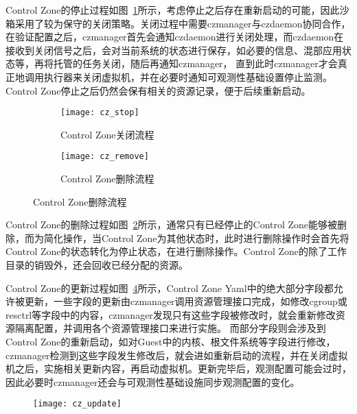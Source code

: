 Control Zone的停止过程如图~\ref{fig:cz_stop}所示，考虑停止之后存在重新启动的可能，因此沙箱采用了较为保守的关闭策略。关闭过程中需要czmanager与czdaemon协同合作，在验证配置之后，czmanager首先会通知czdaemon进行关闭处理，而czdaemon在接收到关闭信号之后，会对当前系统的状态进行保存，如必要的信息、混部应用状态等，再将托管的任务关闭，随后再通知czmanager， 直到此时czmanager才会真正地调用执行器来关闭虚拟机，并在必要时通知可观测性基础设置停止监测。Control Zone停止之后仍然会保有相关的资源记录，便于后续重新启动。

\begin{figure}[H]
    \centering
    \begin{subfigure}[b]{0.46\textwidth}
        \texttt{[image: cz\_stop]}
        \caption{\quad Control Zone关闭流程}
        \label{fig:cz_stop}
    \end{subfigure}
    \begin{subfigure}[b]{0.53\textwidth}
        \texttt{[image: cz\_remove]}
        \caption{\quad Control Zone删除流程}
        \label{fig:cz_remove}
    \end{subfigure}
\label{fig:cz_create_start}
\end{figure}

Control Zone的删除过程如图~\ref{fig:cz_remove}所示，通常只有已经停止的Control Zone能够被删除，而为简化操作，当Control Zone为其他状态时，此时进行删除操作时会首先将Control Zone的状态转化为停止状态，在进行删除操作。Control Zone的除了工作目录的销毁外，还会回收已经分配的资源。

Control Zone的更新过程如图~\ref{fig:cz_update}所示，Control Zone Yaml中的绝大部分字段都允许被更新，一些字段的更新由czmanager调用资源管理接口完成，如修改cgroup或resctrl等字段中的内容，czmanager发现只有这些字段被修改时，就会重新修改资源隔离配置，并调用各个资源管理接口来进行实施。 而部分字段则会涉及到Control Zone的重新启动，如对Guest中的内核、根文件系统等字段进行修改，czmanager检测到这些字段发生修改后，就会进如重新启动的流程，并在关闭虚拟机之后，实施相关更新内容，再启动虚拟机。更新完毕后，观测配置可能会过时，因此必要时czmanager还会与可观测性基础设施同步观测配置的变化。

\begin{figure}[H]
    \centering
    \texttt{[image: cz\_update]}
    \label{fig:cz_update}
\end{figure}

